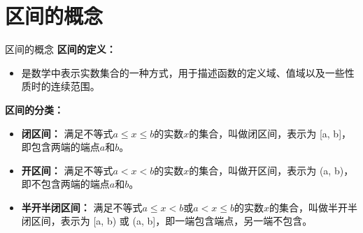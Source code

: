 \documentclass[aspectratio=169]{ctexbeamer} %
\begin{document}
\section{区间的概念}
\begin{frame}{区间的概念}
    \textbf{区间的定义：}
    \begin{itemize}
        \item 是数学中表示实数集合的一种方式，用于描述函数的定义域、值域以及一些性质时的连续范围。
    \end{itemize}

    \vspace{0.5cm}
    \textbf{区间的分类：}
    \begin{itemize}
        \item \textbf{闭区间：} 满足不等式$ a \le x \le b$的实数$x$的集合，叫做\alert{闭区间}，表示为 [a, b]，即包含两端的端点$a$和$b$。
        \item \textbf{开区间：} 满足不等式$ a < x < b$的实数$x$的集合，叫做\alert{开区间}，表示为 (a, b)，即不包含两端的端点$a$和$b$。
        \item \textbf{半开半闭区间：} 满足不等式$ a \le x < b$或$ a < x \le b$的实数$x$的集合，叫做\alert{半开半闭区间}，表示为 [a, b) 或 (a, b]，即一端包含端点，另一端不包含。
    \end{itemize}
\end{frame}
\end{document}
